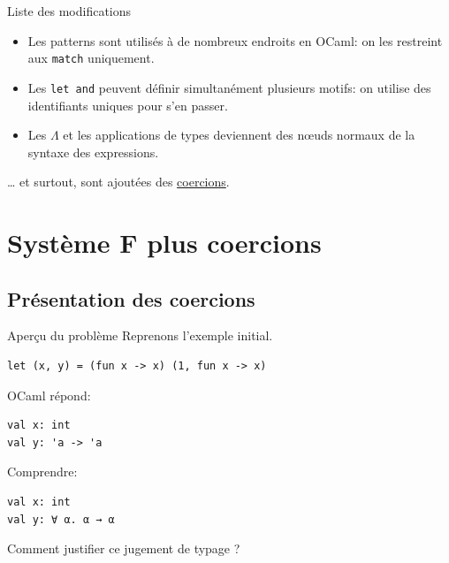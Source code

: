 \documentclass[final]{beamer}
\newcommand{\red}[1]{\textcolor[HTML]{F7800A}{#1}}
\begin{document}
\begin{frame}{Liste des modifications}

  \begin{itemize}
    \item Les patterns sont utilisés à de nombreux endroits en OCaml: on les
      restreint aux \texttt{match} uniquement.
    \item Les \texttt{let and} peuvent définir simultanément plusieurs motifs:
      on utilise des identifiants uniques pour s'en passer.
    \item Les $\Lambda$ et les applications de types deviennent des nœuds
      normaux de la syntaxe des expressions.
  \end{itemize}
  … et surtout, sont ajoutées des \underline{coercions}.

\end{frame}

\section{Système F plus coercions}

\subsection{Présentation des coercions}

\begin{frame}[fragile]{Aperçu du problème}
Reprenons l'exemple initial.

\begin{verbatim}
let (x, y) = (fun x -> x) (1, fun x -> x)
\end{verbatim}

OCaml répond:

\begin{verbatim}
val x: int
val y: 'a -> 'a
\end{verbatim}

Comprendre:

\begin{verbatim}
val x: int
val y: ∀ α. α → α
\end{verbatim}

\red{Comment justifier ce jugement de typage ?}

\end{frame}
\end{document}

